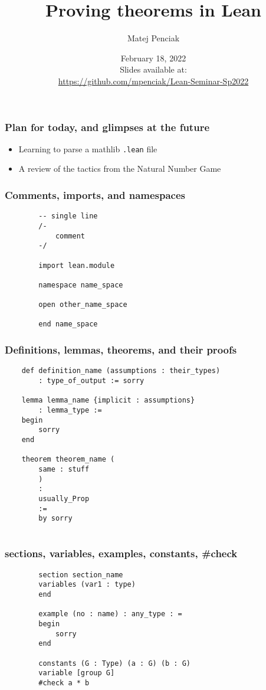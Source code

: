 \documentclass{beamer}
\title{Proving theorems in Lean}
\author{Matej Penciak}
\institute{Northeastern University}
\date{February 18, 2022 \\ Slides available at: \\ \url{https://github.com/mpenciak/Lean-Seminar-Sp2022}}
\begin{document}
\frame{\titlepage}

\begin{frame}[fragile]
    \frametitle{Plan for today, and glimpses at the future}

    \begin{itemize}
        \item Learning to parse a mathlib \verb!.lean! file
        \item A review of the tactics from the Natural Number Game
    \end{itemize}
\end{frame}

\begin{frame}[fragile]
    \frametitle{Comments, imports, and namespaces}

    \begin{lstlisting}
        -- single line
        /- 
            comment 
        -/

        import lean.module

        namespace name_space

        open other_name_space

        end name_space
    \end{lstlisting}

\end{frame}

\begin{frame}[fragile]
    \frametitle{Definitions, lemmas, theorems, and their proofs}

    \begin{lstlisting}
    def definition_name (assumptions : their_types) 
        : type_of_output := sorry

    lemma lemma_name {implicit : assumptions} 
        : lemma_type :=
    begin
        sorry
    end

    theorem theorem_name (
        same : stuff
        )
        : 
        usually_Prop
        := 
        by sorry
    
    \end{lstlisting}

\end{frame}

\begin{frame}[fragile]
    \frametitle{sections, variables, examples, constants, \#check}

    \begin{lstlisting}
        section section_name
        variables (var1 : type)
        end

        example (no : name) : any_type : = 
        begin
            sorry
        end

        constants (G : Type) (a : G) (b : G)
        variable [group G]
        #check a * b
    \end{lstlisting}

\end{frame}
\end{document}
